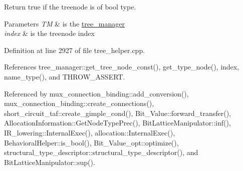 Return true if the treenode is of bool type. 


\begin{DoxyParams}{Parameters}
{\em TM} & is the \hyperlink{classtree__manager}{tree\+\_\+manager} \\
\hline
{\em index} & is the treenode index \\
\hline
\end{DoxyParams}


Definition at line 2927 of file tree\+\_\+helper.\+cpp.



References tree\+\_\+manager\+::get\+\_\+tree\+\_\+node\+\_\+const(), get\+\_\+type\+\_\+node(), index, name\+\_\+type(), and T\+H\+R\+O\+W\+\_\+\+A\+S\+S\+E\+RT.



Referenced by mux\+\_\+connection\+\_\+binding\+::add\+\_\+conversion(), mux\+\_\+connection\+\_\+binding\+::create\+\_\+connections(), short\+\_\+circuit\+\_\+taf\+::create\+\_\+gimple\+\_\+cond(), Bit\+\_\+\+Value\+::forward\+\_\+transfer(), Allocation\+Information\+::\+Get\+Node\+Type\+Prec(), Bit\+Lattice\+Manipulator\+::inf(), I\+R\+\_\+lowering\+::\+Internal\+Exec(), allocation\+::\+Internal\+Exec(), Behavioral\+Helper\+::is\+\_\+bool(), Bit\+\_\+\+Value\+\_\+opt\+::optimize(), structural\+\_\+type\+\_\+descriptor\+::structural\+\_\+type\+\_\+descriptor(), and Bit\+Lattice\+Manipulator\+::sup().

